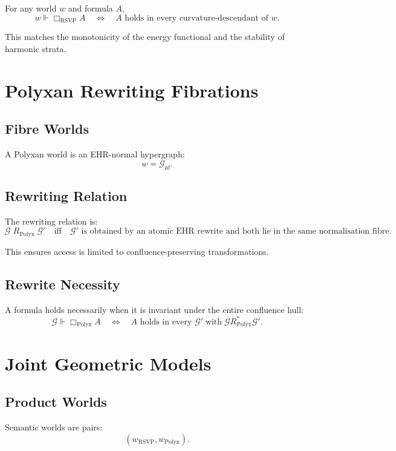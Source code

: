 For any world $w$ and formula $A$,
\[
w \Vdash \Box_{\mathrm{RSVP}} A
\quad\Longleftrightarrow\quad
A \text{ holds in every curvature-descendant of } w.
\]

This matches the monotonicity of the energy functional and the stability of harmonic strata.

\section{Polyxan Rewriting Fibrations}

\subsection{Fibre Worlds}

A Polyxan world is an EHR-normal hypergraph:
\[
w = \mathcal{G}_{\mathrm{nf}}.
\]

\subsection{Rewriting Relation}

The rewriting relation is:
\[
\mathcal{G} \;R_{\mathrm{Polyx}}\; \mathcal{G}'
\quad\text{iff}\quad
\mathcal{G}' 
\text{ is obtained by an atomic EHR rewrite }
\text{and both lie in the same normalisation fibre.}
\]

This ensures access is limited to confluence-preserving transformations.

\subsection{Rewrite Necessity}

A formula holds necessarily when it is invariant under the entire confluence hull:
\[
\mathcal{G} \Vdash \Box_{\mathrm{Polyx}} A
\quad\Longleftrightarrow\quad
A \text{ holds in every } \mathcal{G}' \;\text{with}\; \mathcal{G}R_{\mathrm{Polyx}}^\ast \mathcal{G}'.
\]

\section{Joint Geometric Models}

\subsection{Product Worlds}

Semantic worlds are pairs:
\[
(w_{\mathrm{RSVP}},w_{\mathrm{Polyx}}).
\]

